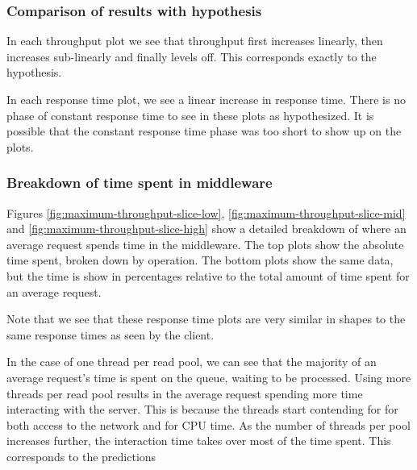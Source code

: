 \documentclass[11pt]{article}
\begin{document}
\subsubsection{Comparison of results with hypothesis}

In each throughput plot we see that throughput first increases linearly, then increases sub-linearly and finally levels off.
This corresponds exactly to the hypothesis.

In each response time plot, we see a linear increase in response time.
There is no phase of constant response time to see in these plots as hypothesized.
It is possible that the constant response time phase was too short to show up on the plots.

\subsubsection{Breakdown of time spent in middleware}


Figures \ref{fig:maximum-throughput-slice-low}, \ref{fig:maximum-throughput-slice-mid} and \ref{fig:maximum-throughput-slice-high} show a detailed breakdown of where an average request spends time in the middleware.
The top plots show the absolute time spent, broken down by operation.
The bottom plots show the same data, but the time is show in percentages relative to the total amount of time spent for an average request.

Note that we see that these response time plots are very similar in shapes to the same response times as seen by the client.

In the case of one thread per read pool, we can see that the majority of an average request's time is spent on the queue, waiting to be processed.
Using more threads per read pool results in the average request spending more time interacting with the server.
This is because the threads start contending for for both access to the network and for CPU time.
As the number of threads per pool increases further, the interaction time takes over most of the time spent.
This corresponds to the predictions
\end{document}
